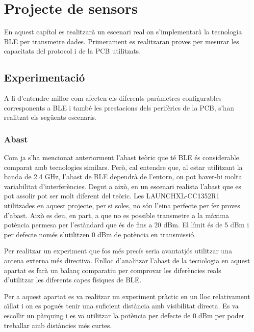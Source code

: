\chapter{Projecte de sensors}
En aquest capítol es realitzarà un escenari real on s'implementarà la tecnologia BLE per transmetre dades.
Primerament es realitzaran proves per mesurar les capacitats del protocol i de la PCB utilitzats.

\section{Experimentació}
A fi d'entendre millor com afecten els diferents paràmetres configurables corresponents a BLE i també les prestacions dels perifèrics de la PCB, s'han realitzat els següents escenaris.


\subsection{Abast}

Com ja s'ha mencionat anteriorment l'abast teòric que té BLE és considerable comparat amb tecnologies similars.
Però, cal entendre que, al estar utilitzant la banda de 2.4 GHz, l'abast de BLE dependrà de l'entorn, on pot haver-hi molta variabilitat d'interferències.
Degut a això, en un escenari realista l'abast que es pot assolir pot ser molt diferent del teòric.
Les LAUNCHXL-CC1352R1 utilitzades en aquest projecte, per si soles, no són l'eina perfecte per fer proves d'abast.
Això es deu, en part, a que no es possible transmetre a la màxima potència permesa per l'estàndard que és de fins a 20 dBm.
El límit és de 5 dBm i per defecte només s'utilitzen 0 dBm de potència en transmissió.

Per realitzar un experiment que fos més precís seria avantatjós utilitzar una antena externa més directiva.
Enlloc d'analitzar l'abast de la tecnologia en aquest apartat es farà un balanç comparatiu per comprovar les diferències reals d'utilitzar les diferents capes físiques de BLE.

Per a aquest apartat es va realitzar un experiment pràctic en un lloc relativament aïllat i on es pogués tenir una suficient distància amb visibilitat directa.
Es va escollir un pàrquing i es va utilitzar la potència per defecte de 0 dBm per poder treballar amb distàncies més curtes.

